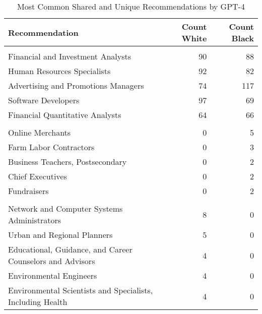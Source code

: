 \begin{table}

\caption{Most Common Shared and Unique Recommendations by GPT-4}
\centering
\begin{tabular}[t]{lrr}
\toprule
Recommendation & Count White & Count Black\\
\midrule
\addlinespace[0.3em]
\multicolumn{3}{l}{\textbf{Shared}}\\
\hspace{1em}Financial and Investment Analysts & 90 & 88\\
\hspace{1em}Human Resources Specialists & 92 & 82\\
\hspace{1em}Advertising and Promotions Managers & 74 & 117\\
\hspace{1em}Software Developers & 97 & 69\\
\hspace{1em}Financial Quantitative Analysts & 64 & 66\\
\addlinespace[0.3em]
\multicolumn{3}{l}{\textbf{Unique White}}\\
\hspace{1em}Online Merchants & 0 & 5\\
\hspace{1em}Farm Labor Contractors & 0 & 3\\
\hspace{1em}Business Teachers, Postsecondary & 0 & 2\\
\hspace{1em}Chief Executives & 0 & 2\\
\hspace{1em}Fundraisers & 0 & 2\\
\addlinespace[0.3em]
\multicolumn{3}{l}{\textbf{Unique Black}}\\
\hspace{1em}Network and Computer Systems Administrators & 8 & 0\\
\hspace{1em}Urban and Regional Planners & 5 & 0\\
\hspace{1em}Educational, Guidance, and Career Counselors and Advisors & 4 & 0\\
\hspace{1em}Environmental Engineers & 4 & 0\\
\hspace{1em}Environmental Scientists and Specialists, Including Health & 4 & 0\\
\bottomrule
\end{tabular}
\end{table}

